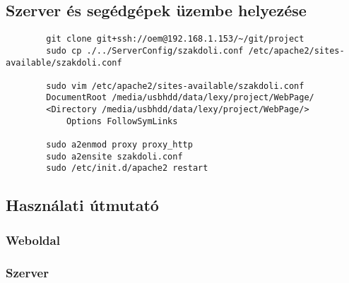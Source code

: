 \subsection{Szerver és segédgépek üzembe helyezése}
	\begin{verbatim}
		git clone git+ssh://oem@192.168.1.153/~/git/project
		sudo cp ./../ServerConfig/szakdoli.conf /etc/apache2/sites-available/szakdoli.conf

		sudo vim /etc/apache2/sites-available/szakdoli.conf
		DocumentRoot /media/usbhdd/data/lexy/project/WebPage/
        <Directory /media/usbhdd/data/lexy/project/WebPage/>
            Options FollowSymLinks

        sudo a2enmod proxy proxy_http
        sudo a2ensite szakdoli.conf
		sudo /etc/init.d/apache2 restart
	\end{verbatim}

\subsection{Használati útmutató}
\subsubsection{Weboldal}
\subsubsection{Szerver}
